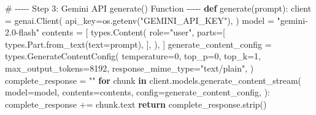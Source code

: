 \documentclass[
  12pt,
  letterpaper,
  DIV=11,
  numbers=noendperiod,
  abstract]{scrartcl}
\newenvironment{Shaded}{\begin{snugshade}}{\end{snugshade}}
\newcommand{\CommentTok}[1]{\textcolor[rgb]{0.37,0.37,0.37}{#1}}
\newcommand{\ControlFlowTok}[1]{\textcolor[rgb]{0.00,0.23,0.31}{\textbf{#1}}}
\newcommand{\DecValTok}[1]{\textcolor[rgb]{0.68,0.00,0.00}{#1}}
\newcommand{\KeywordTok}[1]{\textcolor[rgb]{0.00,0.23,0.31}{\textbf{#1}}}
\newcommand{\NormalTok}[1]{\textcolor[rgb]{0.00,0.23,0.31}{#1}}
\newcommand{\OperatorTok}[1]{\textcolor[rgb]{0.37,0.37,0.37}{#1}}
\newcommand{\StringTok}[1]{\textcolor[rgb]{0.13,0.47,0.30}{#1}}
\begin{document}
\begin{Shaded}
\begin{Highlighting}[]
\CommentTok{\# {-}{-}{-}{-}{-} Step 3: Gemini API generate() Function {-}{-}{-}{-}{-}}
\KeywordTok{def}\NormalTok{ generate(prompt):}
\NormalTok{    client }\OperatorTok{=}\NormalTok{ genai.Client(}
\NormalTok{        api\_key}\OperatorTok{=}\NormalTok{os.getenv(}\StringTok{"GEMINI\_API\_KEY"}\NormalTok{),}
\NormalTok{    )}
\NormalTok{    model }\OperatorTok{=} \StringTok{"gemini{-}2.0{-}flash"}
\NormalTok{    contents }\OperatorTok{=}\NormalTok{ [}
\NormalTok{        types.Content(}
\NormalTok{            role}\OperatorTok{=}\StringTok{"user"}\NormalTok{,}
\NormalTok{            parts}\OperatorTok{=}\NormalTok{[}
\NormalTok{                types.Part.from\_text(text}\OperatorTok{=}\NormalTok{prompt),}
\NormalTok{            ],}
\NormalTok{        ),}
\NormalTok{    ]}
\NormalTok{    generate\_content\_config }\OperatorTok{=}\NormalTok{ types.GenerateContentConfig(}
\NormalTok{        temperature}\OperatorTok{=}\DecValTok{0}\NormalTok{,}
\NormalTok{        top\_p}\OperatorTok{=}\DecValTok{0}\NormalTok{,}
\NormalTok{        top\_k}\OperatorTok{=}\DecValTok{1}\NormalTok{,}
\NormalTok{        max\_output\_tokens}\OperatorTok{=}\DecValTok{8192}\NormalTok{,}
\NormalTok{        response\_mime\_type}\OperatorTok{=}\StringTok{"text/plain"}\NormalTok{,}
\NormalTok{    )}
\NormalTok{    complete\_response }\OperatorTok{=} \StringTok{""}
    \ControlFlowTok{for}\NormalTok{ chunk }\KeywordTok{in}\NormalTok{ client.models.generate\_content\_stream(}
\NormalTok{        model}\OperatorTok{=}\NormalTok{model,}
\NormalTok{        contents}\OperatorTok{=}\NormalTok{contents,}
\NormalTok{        config}\OperatorTok{=}\NormalTok{generate\_content\_config,}
\NormalTok{    ):}
\NormalTok{        complete\_response }\OperatorTok{+=}\NormalTok{ chunk.text}
    \ControlFlowTok{return}\NormalTok{ complete\_response.strip()}


\end{Highlighting}
\end{Shaded}
\end{document}
